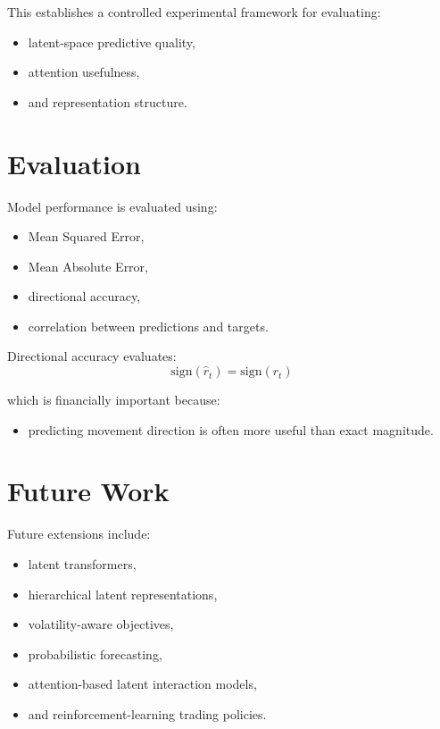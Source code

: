 \documentclass[11pt]{article}
\begin{document}
This establishes a controlled experimental framework for evaluating:
\begin{itemize}
    \item latent-space predictive quality,
    \item attention usefulness,
    \item and representation structure.
\end{itemize}


\section{Evaluation}

Model performance is evaluated using:
\begin{itemize}
    \item Mean Squared Error,
    \item Mean Absolute Error,
    \item directional accuracy,
    \item correlation between predictions and targets.
\end{itemize}

Directional accuracy evaluates:
\[
\text{sign}(\hat r_t)
=
\text{sign}(r_t)
\]

which is financially important because:
\begin{itemize}
    \item predicting movement direction
    is often more useful than exact magnitude.
\end{itemize}

\section{Future Work}

Future extensions include:
\begin{itemize}
    \item latent transformers,
    \item hierarchical latent representations,
    \item volatility-aware objectives,
    \item probabilistic forecasting,
    \item attention-based latent interaction models,
    \item and reinforcement-learning trading policies.
\end{itemize}
\end{document}

